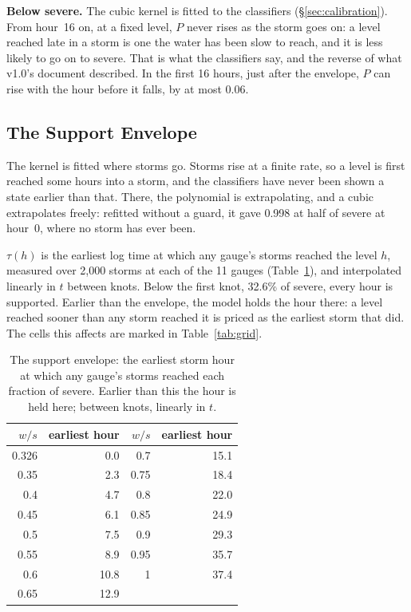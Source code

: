 \documentclass[11pt,a4paper]{article}
\begin{document}
\textbf{Below severe.} The cubic kernel is fitted to the classifiers
(\S\ref{sec:calibration}). From hour~16 on, at a fixed level, $P$ never rises as the
storm goes on: a level reached late in a storm is one the water has been slow to reach,
and it is less likely to go on to severe. That is what the classifiers say, and the
reverse of what v1.0's document described. In the first 16 hours, just after the
envelope, $P$ can rise with the hour before it falls, by at most 0.06.

\subsection{The Support Envelope}\label{sec:envelope}
The kernel is fitted where storms go. Storms rise at a finite rate, so a level is
first reached some hours into a storm, and the classifiers have never been shown a
state earlier than that. There, the polynomial is extrapolating, and a cubic
extrapolates freely: refitted without a guard, it gave 0.998 at half of severe at
hour~0, where no storm has ever been.

$\tau(h)$ is the earliest log time at which any gauge's storms reached the level $h$,
measured over 2,000 storms at each of the 11 gauges (Table~\ref{tab:envelope}), and
interpolated linearly in $t$ between knots. Below the first knot, 32.6\% of severe,
every hour is supported. Earlier than the envelope, the model holds the hour there:
a level reached sooner than any storm reached it is priced as the earliest storm that
did. The cells this affects are marked in Table~\ref{tab:grid}.

\begin{table}[ht]\centering\begin{tabular}{rr|rr}
$w/s$ & earliest hour & $w/s$ & earliest hour \\ \hline
0.326 & 0.0 & 0.7 & 15.1 \\
0.35 & 2.3 & 0.75 & 18.4 \\
0.4 & 4.7 & 0.8 & 22.0 \\
0.45 & 6.1 & 0.85 & 24.9 \\
0.5 & 7.5 & 0.9 & 29.3 \\
0.55 & 8.9 & 0.95 & 35.7 \\
0.6 & 10.8 & 1 & 37.4 \\
0.65 & 12.9 &  &  \\
\end{tabular}\caption{The support envelope: the earliest storm hour at which any gauge's storms reached each fraction of severe. Earlier than this the hour is held here; between knots, linearly in $t$.}\label{tab:envelope}\end{table}
\end{document}
